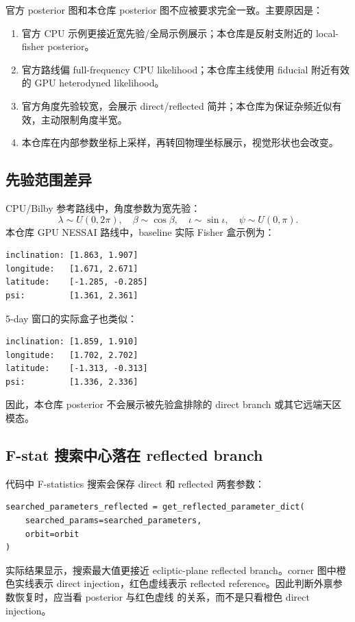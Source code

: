 \documentclass[11pt,a4paper]{ctexart}
\begin{document}
官方 posterior 图和本仓库 posterior 图不应被要求完全一致。主要原因是：
\begin{enumerate}
  \item 官方 CPU 示例更接近宽先验/全局示例展示；本仓库是反射支附近的 local-fisher posterior。
  \item 官方路线偏 full-frequency CPU likelihood；本仓库主线使用 fiducial 附近有效的 GPU heterodyned likelihood。
  \item 官方角度先验较宽，会展示 direct/reflected 简并；本仓库为保证杂频近似有效，主动限制角度半宽。
  \item 本仓库在内部参数坐标上采样，再转回物理坐标展示，视觉形状也会改变。
\end{enumerate}

\subsection{先验范围差异}

CPU/Bilby 参考路线中，角度参数为宽先验：
\[
\lambda\sim U(0,2\pi),\quad
\beta\sim \cos\beta,\quad
\iota\sim \sin\iota,\quad
\psi\sim U(0,\pi).
\]
本仓库 GPU NESSAI 路线中，baseline 实际 Fisher 盒示例为：
\begin{verbatim}
inclination: [1.863, 1.907]
longitude:   [1.671, 2.671]
latitude:    [-1.285, -0.285]
psi:         [1.361, 2.361]
\end{verbatim}
5-day 窗口的实际盒子也类似：
\begin{verbatim}
inclination: [1.859, 1.910]
longitude:   [1.702, 2.702]
latitude:    [-1.313, -0.313]
psi:         [1.336, 2.336]
\end{verbatim}

因此，本仓库 posterior 不会展示被先验盒排除的 direct branch 或其它远端天区模态。

\subsection{F-stat 搜索中心落在 reflected branch}

代码中 F-statistics 搜索会保存 direct 和 reflected 两套参数：
\begin{lstlisting}[style=pycode]
searched_parameters_reflected = get_reflected_parameter_dict(
    searched_params=searched_parameters,
    orbit=orbit
)
\end{lstlisting}

实际结果显示，搜索最大值更接近 ecliptic-plane reflected branch。corner 图中橙色实线表示 direct
injection，红色虚线表示 reflected reference。因此判断外禀参数恢复时，应当看 posterior 与红色虚线
的关系，而不是只看橙色 direct injection。
\end{document}

